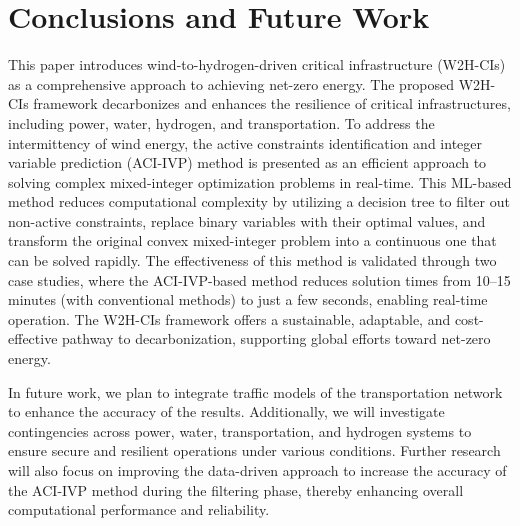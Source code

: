 \documentclass[conference]{IEEEtran}
\begin{document}
\section{Conclusions and Future Work}\label{sec: Conclusions}
This paper introduces wind-to-hydrogen-driven critical infrastructure (W2H-CIs) as a comprehensive approach to achieving net-zero energy. The proposed W2H-CIs framework decarbonizes and enhances the resilience of critical infrastructures, including power, water, hydrogen, and transportation. To address the intermittency of wind energy, the active constraints identification and integer variable prediction (ACI-IVP) method is presented as an efficient approach to solving complex mixed-integer optimization problems in real-time. This ML-based method reduces computational complexity by utilizing a decision tree to filter out non-active constraints, replace binary variables with their optimal values, and transform the original convex mixed-integer problem into a continuous one that can be solved rapidly. The effectiveness of this method is validated through two case studies, where the ACI-IVP-based method reduces solution times from 10–15 minutes (with conventional methods) to just a few seconds, enabling real-time operation. The W2H-CIs framework offers a sustainable, adaptable, and cost-effective pathway to decarbonization, supporting global efforts toward net-zero energy.

In future work, we plan to integrate traffic models of the transportation network to enhance the accuracy of the results. Additionally, we will investigate contingencies across power, water, transportation, and hydrogen systems to ensure secure and resilient operations under various conditions. Further research will also focus on improving the data-driven approach to increase the accuracy of the ACI-IVP method during the filtering phase, thereby enhancing overall computational performance and reliability.




	

\end{document}
